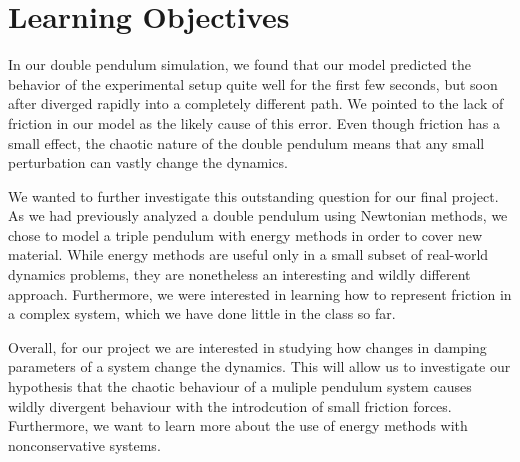 \section{Learning Objectives}
In our double pendulum simulation, we found that our model predicted the behavior of the experimental setup quite well for the first few seconds, but soon after diverged rapidly into a completely different path. We pointed to the lack of friction in our model as the likely cause of this error. Even though friction has a small effect, the chaotic nature of the double pendulum means that any small perturbation can vastly change the dynamics.

We wanted to further investigate this outstanding question for our final project. As we had previously analyzed a double pendulum using Newtonian methods, we chose to model a triple pendulum with energy methods in order to cover new material. While energy methods are useful only in a small subset of real-world dynamics problems, they are nonetheless an interesting and wildly different approach. Furthermore, we were interested in learning how to represent friction in a complex system, which we have done little in the class so far. 

Overall, for our project we are interested in studying how changes in damping parameters of a system change the dynamics. This will allow us to investigate our hypothesis that the chaotic behaviour of a muliple pendulum system causes wildly divergent behaviour with the introdcution of small friction forces.  Furthermore, we want to learn more about the use of energy methods with nonconservative systems.
